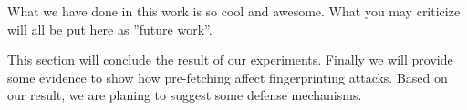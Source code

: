 
What we have done in this work is so cool and awesome.
What you may criticize will all be put here as ''future work''.

This section will conclude the result of our experiments. Finally we will provide some evidence to show how pre-fetching affect fingerprinting attacks. Based on our result, we are planing to suggest some defense mechanisms.

